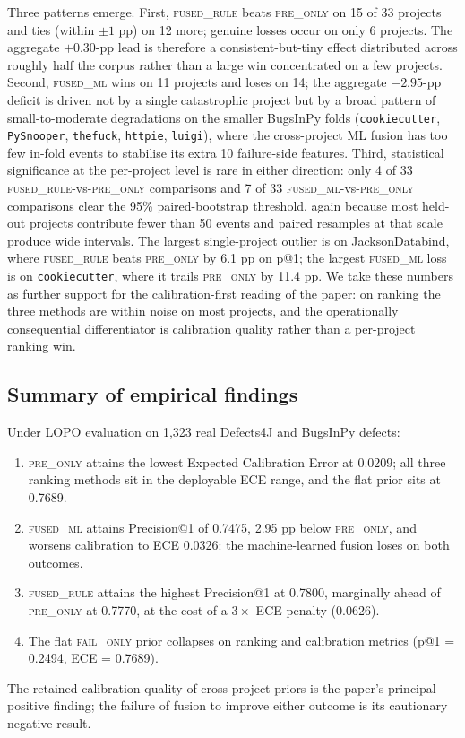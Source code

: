 \documentclass[preprint,12pt]{elsarticle}
\begin{document}
Three patterns emerge. First, \textsc{fused\_rule} beats \textsc{pre\_only} on 15 of 33 projects and ties (within $\pm 1$ pp) on 12 more; genuine losses occur on only 6 projects. The aggregate $+0.30$-pp lead is therefore a consistent-but-tiny effect distributed across roughly half the corpus rather than a large win concentrated on a few projects. Second, \textsc{fused\_ml} wins on 11 projects and loses on 14; the aggregate $-2.95$-pp deficit is driven not by a single catastrophic project but by a broad pattern of small-to-moderate degradations on the smaller BugsInPy folds (\texttt{cookiecutter}, \texttt{PySnooper}, \texttt{thefuck}, \texttt{httpie}, \texttt{luigi}), where the cross-project ML fusion has too few in-fold events to stabilise its extra 10 failure-side features. Third, statistical significance at the per-project level is rare in either direction: only 4 of 33 \textsc{fused\_rule}-vs-\textsc{pre\_only} comparisons and 7 of 33 \textsc{fused\_ml}-vs-\textsc{pre\_only} comparisons clear the 95\% paired-bootstrap threshold, again because most held-out projects contribute fewer than 50 events and paired resamples at that scale produce wide intervals. The largest single-project outlier is on JacksonDatabind, where \textsc{fused\_rule} beats \textsc{pre\_only} by 6.1 pp on p@1; the largest \textsc{fused\_ml} loss is on \texttt{cookiecutter}, where it trails \textsc{pre\_only} by 11.4 pp. We take these numbers as further support for the calibration-first reading of the paper: on ranking the three methods are within noise on most projects, and the operationally consequential differentiator is calibration quality rather than a per-project ranking win.

\subsection{Summary of empirical findings}

Under LOPO evaluation on 1{,}323 real Defects4J and BugsInPy defects:
\begin{enumerate}
\item \textsc{pre\_only} attains the lowest Expected Calibration Error at 0.0209; all three ranking methods sit in the deployable ECE range, and the flat prior sits at 0.7689.
\item \textsc{fused\_ml} attains Precision@1 of 0.7475, 2.95 pp below \textsc{pre\_only}, and worsens calibration to ECE 0.0326: the machine-learned fusion loses on both outcomes.
\item \textsc{fused\_rule} attains the highest Precision@1 at 0.7800, marginally ahead of \textsc{pre\_only} at 0.7770, at the cost of a $3\times$ ECE penalty (0.0626).
\item The flat \textsc{fail\_only} prior collapses on ranking and calibration metrics (p@1 = 0.2494, ECE = 0.7689).
\end{enumerate}
The retained calibration quality of cross-project priors is the paper's principal positive finding; the failure of fusion to improve either outcome is its cautionary negative result.
\end{document}
